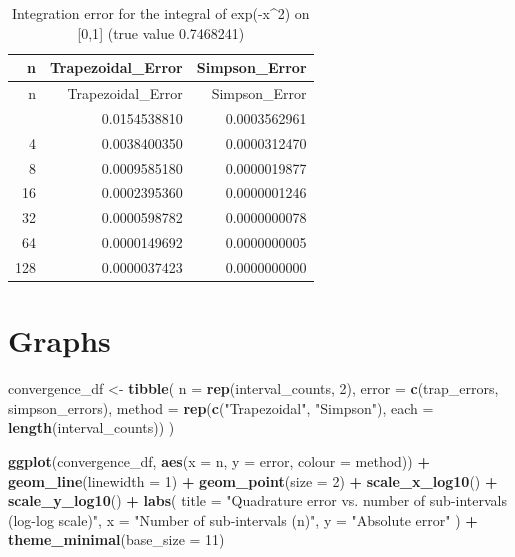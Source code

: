 \documentclass[
]{article}
\newenvironment{Shaded}{\begin{snugshade}}{\end{snugshade}}
\newcommand{\AttributeTok}[1]{\textcolor[rgb]{0.13,0.29,0.53}{#1}}
\newcommand{\DecValTok}[1]{\textcolor[rgb]{0.00,0.00,0.81}{#1}}
\newcommand{\FunctionTok}[1]{\textcolor[rgb]{0.13,0.29,0.53}{\textbf{#1}}}
\newcommand{\NormalTok}[1]{#1}
\newcommand{\OtherTok}[1]{\textcolor[rgb]{0.56,0.35,0.01}{#1}}
\newcommand{\SpecialCharTok}[1]{\textcolor[rgb]{0.81,0.36,0.00}{\textbf{#1}}}
\newcommand{\StringTok}[1]{\textcolor[rgb]{0.31,0.60,0.02}{#1}}
\begin{document}
\begin{longtable}[]{@{}rrr@{}}
\caption{Integration error for the integral of exp(-x\^{}2) on {[}0,1{]}
(true value 0.7468241)}\tabularnewline
\toprule\noalign{}
n & Trapezoidal\_Error & Simpson\_Error \\
\midrule\noalign{}
\endfirsthead
\toprule\noalign{}
n & Trapezoidal\_Error & Simpson\_Error \\
\midrule\noalign{}
\endhead
\bottomrule\noalign{}
\endlastfoot
2 & 0.0154538810 & 0.0003562961 \\
4 & 0.0038400350 & 0.0000312470 \\
8 & 0.0009585180 & 0.0000019877 \\
16 & 0.0002395360 & 0.0000001246 \\
32 & 0.0000598782 & 0.0000000078 \\
64 & 0.0000149692 & 0.0000000005 \\
128 & 0.0000037423 & 0.0000000000 \\
\end{longtable}

\section{Graphs}\label{graphs}

\begin{Shaded}
\begin{Highlighting}[]
\NormalTok{convergence\_df }\OtherTok{\textless{}{-}} \FunctionTok{tibble}\NormalTok{(}
  \AttributeTok{n =} \FunctionTok{rep}\NormalTok{(interval\_counts, }\DecValTok{2}\NormalTok{),}
  \AttributeTok{error =} \FunctionTok{c}\NormalTok{(trap\_errors, simpson\_errors),}
  \AttributeTok{method =} \FunctionTok{rep}\NormalTok{(}\FunctionTok{c}\NormalTok{(}\StringTok{"Trapezoidal"}\NormalTok{, }\StringTok{"Simpson"}\NormalTok{), }\AttributeTok{each =} \FunctionTok{length}\NormalTok{(interval\_counts))}
\NormalTok{)}

\FunctionTok{ggplot}\NormalTok{(convergence\_df, }\FunctionTok{aes}\NormalTok{(}\AttributeTok{x =}\NormalTok{ n, }\AttributeTok{y =}\NormalTok{ error, }\AttributeTok{colour =}\NormalTok{ method)) }\SpecialCharTok{+}
  \FunctionTok{geom\_line}\NormalTok{(}\AttributeTok{linewidth =} \DecValTok{1}\NormalTok{) }\SpecialCharTok{+}
  \FunctionTok{geom\_point}\NormalTok{(}\AttributeTok{size =} \DecValTok{2}\NormalTok{) }\SpecialCharTok{+}
  \FunctionTok{scale\_x\_log10}\NormalTok{() }\SpecialCharTok{+}
  \FunctionTok{scale\_y\_log10}\NormalTok{() }\SpecialCharTok{+}
  \FunctionTok{labs}\NormalTok{(}
    \AttributeTok{title =} \StringTok{"Quadrature error vs. number of sub{-}intervals (log{-}log scale)"}\NormalTok{,}
    \AttributeTok{x =} \StringTok{"Number of sub{-}intervals (n)"}\NormalTok{, }\AttributeTok{y =} \StringTok{"Absolute error"}
\NormalTok{  ) }\SpecialCharTok{+}
  \FunctionTok{theme\_minimal}\NormalTok{(}\AttributeTok{base\_size =} \DecValTok{11}\NormalTok{)}
\end{Highlighting}
\end{Shaded}
\end{document}
